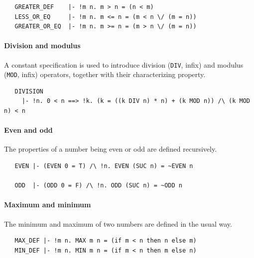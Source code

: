 \begin{hol}
\begin{verbatim}
   GREATER_DEF    |- !m n. m > n = (n < m)
   LESS_OR_EQ     |- !m n. m <= n = (m < n \/ (m = n))
   GREATER_OR_EQ  |- !m n. m >= n = (m > n \/ (m = n))
\end{verbatim}
\end{hol}

\paragraph{Division and modulus}

A constant specification is used to introduce division ({\small\verb+DIV+}, infix) and
modulus ({\small\verb+MOD+}, infix) operators, together with their
characterizing property.
\begin{hol}
\begin{verbatim}
   DIVISION
     |- !n. 0 < n ==> !k. (k = ((k DIV n) * n) + (k MOD n)) /\ (k MOD n) < n
\end{verbatim}
\end{hol}

\paragraph{Even and odd}

The properties of a number being even or odd are defined recursively.
%
\begin{hol}
\begin{verbatim}
   EVEN |- (EVEN 0 = T) /\ !n. EVEN (SUC n) = ~EVEN n

   ODD  |- (ODD 0 = F) /\ !n. ODD (SUC n) = ~ODD n
\end{verbatim}
\end{hol}

\paragraph{Maximum and minimum}

The minimum and maximum of two numbers are defined in the usual way.
%
\begin{hol}
\begin{verbatim}
   MAX_DEF |- !m n. MAX m n = (if m < n then n else m)
   MIN_DEF |- !m n. MIN m n = (if m < n then m else n)
\end{verbatim}
\end{hol}

